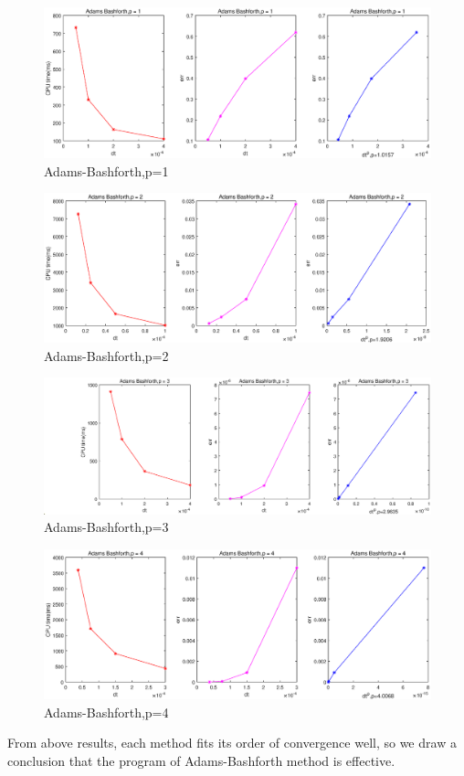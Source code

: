 \documentclass[a4paper,twocolumn]{article}
\theoremstyle{definition}
\begin{document}
\begin{figure}[!htp]   
	\centering
	\includegraphics[width=14.2cm]{Pictures/2_1_1.eps}
	\caption{Adams-Bashforth,p=1}
	\label{fig:AB1gf}
\end{figure}
\begin{figure}[!htp]   
	\centering
	\includegraphics[width=14.2cm]{Pictures/2_1_2.eps}
	\caption{Adams-Bashforth,p=2}
	\label{fig:AB2gf}
\end{figure}
\begin{figure}[!htp]   
	\centering
	\includegraphics[width=14.2cm]{Pictures/2_1_3.eps}
	\caption{Adams-Bashforth,p=3}
	\label{fig:AB3gf}
\end{figure}
\begin{figure}[!htp]   
	\centering
	\includegraphics[width=14.2cm]{Pictures/2_1_4.eps}
	\caption{Adams-Bashforth,p=4}
	\label{fig:AB4gf}
\end{figure}
\clearpage
\noindent From above results, each method fits its order of convergence well, so we draw a conclusion that the program of Adams-Bashforth method is effective. 
\end{document}
